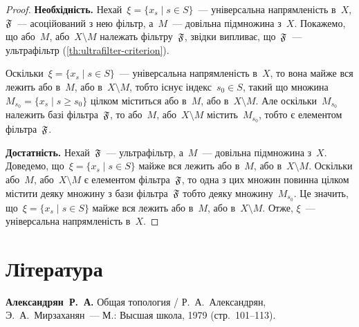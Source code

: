 \begin{proof}
    \textbf{Необхідність.} Нехай~$\xi = \{x_s \mid s \in S\}$~--- універсальна напрямленість в~$X$, $\frak F$~--- асоційований з нею фільтр, а~$M$~--- довільна підмножина з~$X$. Покажемо, що або~$M$, або~$X \setminus M$ належать фільтру~$\frak F$, звідки випливає, що~$\frak F$~--- ультрафільтр (\cref{th:ultrafilter-criterion}). 
    
    Оскільки~$\xi = \{x_s \mid s \in S\}$~--- універсальна напрямленість в~$X$, то вона майже вся лежить або в~$M$, або в~$X \setminus M$, тобто існує індекс~$s_0 \in S$, такий що множина~$M_{s_0} = \{x_s \mid s \ge s_0\}$ цілком міститься або в~$M$, або в~$X \setminus M$. Але оскільки~$M_{s_0}$ належить базі фільтра~$\frak F$, то або~$M$, або~$X \setminus M$ містить~$M_{s_0}$, тобто є елементом фільтра~$\frak F$. 
    
    \textbf{Достатність.} Нехай~$\frak F$~--- ультрафільтр, а~$M$~--- довільна підмножина з~$X$. Доведемо, що~$\xi = \{x_s \mid s \in S\}$ майже вся лежить або в~$M$, або в~$X \setminus M$. Оскільки або~$M$, або~$X \setminus M$ є елементом фільтра~$\frak F$, то одна з цих множин повинна цілком містити деяку множину з бази фільтра~$\frak F$ тобто деяку множину~$M_{s_0}$. Це значить, що~$\xi = \{x_s \mid s \in S\}$ майже вся лежить або в~$M$, або в~$X \setminus M$. Отже, $\xi$~--- універсальна напрямленість в~$X$.
\end{proof}

\section{Література}

\begin{enumerate}[label={[\arabic*]}]
\item \textbf{Александрян~Р.~А.}
Общая топология /
Р.~А.~Александрян, Э.~А.~Мирзаханян~---
М.: Высшая школа, 1979 (стр.~101--113).
\end{enumerate}

